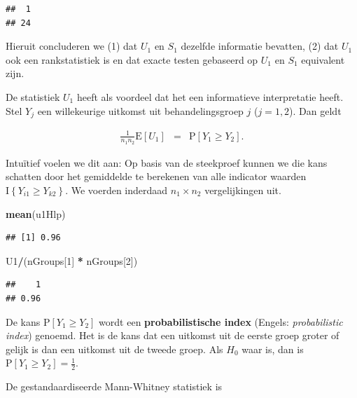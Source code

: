 \documentclass[
  12pt,dutch]{book}
\newenvironment{Shaded}{\begin{snugshade}}{\end{snugshade}}
\newcommand{\DecValTok}[1]{\textcolor[rgb]{0.00,0.00,0.81}{#1}}
\newcommand{\FunctionTok}[1]{\textcolor[rgb]{0.13,0.29,0.53}{\textbf{#1}}}
\newcommand{\NormalTok}[1]{#1}
\newcommand{\SpecialCharTok}[1]{\textcolor[rgb]{0.81,0.36,0.00}{\textbf{#1}}}
\theoremstyle{definition}
\theoremstyle{definition}
\theoremstyle{definition}
\theoremstyle{definition}
\theoremstyle{remark}
\begin{document}
\begin{verbatim}
##  1 
## 24
\end{verbatim}

Hieruit concluderen we (1) dat \(U_1\) en \(S_1\) dezelfde informatie bevatten, (2) dat \(U_1\) ook een rankstatistiek is en dat exacte testen gebaseerd op \(U_1\) en \(S_1\) equivalent zijn.

De statistiek \(U_1\) heeft als voordeel dat het een informatieve interpretatie heeft.
Stel \(Y_j\) een willekeurige uitkomst uit behandelingsgroep \(j\) (\(j=1,2\)). Dan geldt

\begin{eqnarray*}
  \frac{1}{n_1n_2}\text{E}\left[U_1\right]
     &=& \text{P}\left[Y_1 \geq Y_2\right].
\end{eqnarray*}

Intuïtief voelen we dit aan: Op basis van de steekproef kunnen we die kans schatten door het gemiddelde te berekenen van alle indicator waarden \(\text{I}\left\{Y_{i1}\geq Y_{k2}\right\}\).
We voerden inderdaad \(n_1 \times n_2\) vergelijkingen uit.

\begin{Shaded}
\begin{Highlighting}[]
\FunctionTok{mean}\NormalTok{(u1Hlp)}
\end{Highlighting}
\end{Shaded}

\begin{verbatim}
## [1] 0.96
\end{verbatim}

\begin{Shaded}
\begin{Highlighting}[]
\NormalTok{U1}\SpecialCharTok{/}\NormalTok{(nGroups[}\DecValTok{1}\NormalTok{] }\SpecialCharTok{*}\NormalTok{ nGroups[}\DecValTok{2}\NormalTok{])}
\end{Highlighting}
\end{Shaded}

\begin{verbatim}
##    1 
## 0.96
\end{verbatim}

De kans \(\text{P}\left[Y_1 \geq Y_2\right]\) wordt een \textbf{probabilistische index} (Engels: \emph{probabilistic index}) genoemd.
Het is de kans dat een uitkomst uit de eerste groep groter of gelijk is dan een uitkomst uit de tweede groep.
Als \(H_0\) waar is, dan is \(\text{P}\left[Y_1 \geq Y_2\right]=\frac{1}{2}\).

De gestandaardiseerde Mann-Whitney statistiek is
\end{document}
